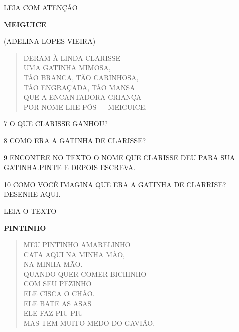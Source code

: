 \begin{escola}

LEIA COM ATENÇÃO

\textbf{MEIGUICE}

(ADELINA LOPES VIEIRA)

\begin{verse}
DERAM À LINDA CLARISSE\\
UMA GATINHA MIMOSA,\\
TÃO BRANCA, TÃO CARINHOSA,\\
TÃO ENGRAÇADA, TÃO MANSA\\
QUE A ENCANTADORA CRIANÇA\\
POR NOME LHE PÔS --- MEIGUICE.
\end{verse}



\num{7} O QUE CLARISSE GANHOU?


\num{8} COMO ERA A GATINHA DE CLARISSE?


\num{9} ENCONTRE NO TEXTO O NOME QUE CLARISSE DEU PARA SUA GATINHA.PINTE E DEPOIS ESCREVA.


\num{10} COMO VOCÊ IMAGINA QUE ERA A GATINHA DE CLARRISE? DESENHE AQUI.


LEIA O TEXTO

\textbf{PINTINHO}

\begin{verse}
MEU PINTINHO AMARELINHO\\
CATA AQUI NA MINHA MÃO,\\
NA MINHA MÃO.\\
QUANDO QUER COMER BICHINHO\\
COM SEU PEZINHO\\
ELE CISCA O CHÃO.\\
ELE BATE AS ASAS\\
ELE FAZ PIU-PIU\\
MAS TEM MUITO MEDO DO GAVIÃO.
\end{verse}


\end{escola}
